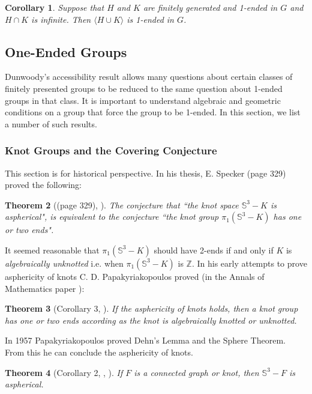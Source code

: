 \documentclass[12pt]{article}
\newtheorem{theorem}{Theorem}[subsection]
\newtheorem{corollary}[theorem]{Corollary}
\begin{document}
\begin{corollary}
Suppose that $H$ and $K$ are finitely generated and 1-ended in $G$ and $H\cap K$ is infinite. Then $\langle H\cup K\rangle$ is 1-ended in $G$. 
\end{corollary}

\newpage
\subsection{One-Ended Groups}\label{1eg}

Dunwoody's accessibility result allows many questions about certain classes of finitely presented groups to be reduced to the same question about 1-ended groups in that class. It is important to understand algebraic and geometric conditions on a group that force the group to be 1-ended. In this section, we list a number of such results. 
 
 
\subsubsection{Knot Groups and the Covering Conjecture}\label{KGs} 
This section is for historical perspective. 
In his thesis, E. Specker \cite{Sp49} (page 329) proved the following: 

\begin{theorem} [(page 329), \cite{Sp49}] 
The conjecture that  ``the knot space $\mathbb S^3-K$ is aspherical", is  equivalent to the conjecture  ``the knot group $\pi_1(\mathbb S^3-K)$ has one or two ends". 
\end{theorem}

It seemed reasonable that  $\pi_1(\mathbb S^3-K)$ should have 2-ends if and only if $K$ is {\it algebraically unknotted} i.e. when $\pi_1(\mathbb S^3-K)$ is $\mathbb Z$. 
In his early attempts to prove asphericity of knots C. D. Papakyriakopoulos proved (in the Annals of Mathematics paper \cite{Pap55}): 
\begin{theorem} [Corollary 3, \cite{Pap55}] \label{knot}  
If the asphericity of knots holds, then a knot group has one or two ends according as the knot is algebraically knotted or unknotted. 
\end{theorem}

In 1957 Papakyriakopoulos proved Dehn's Lemma and the Sphere Theorem. From this he can conclude the asphericity of knots. 

\begin{theorem} [Corollary 2, \cite{Pap57}, \cite{Pap57b}]
If $F$ is  a connected graph or knot, then $\mathbb S^3-F$ is aspherical.
\end{theorem} 
\end{document}
